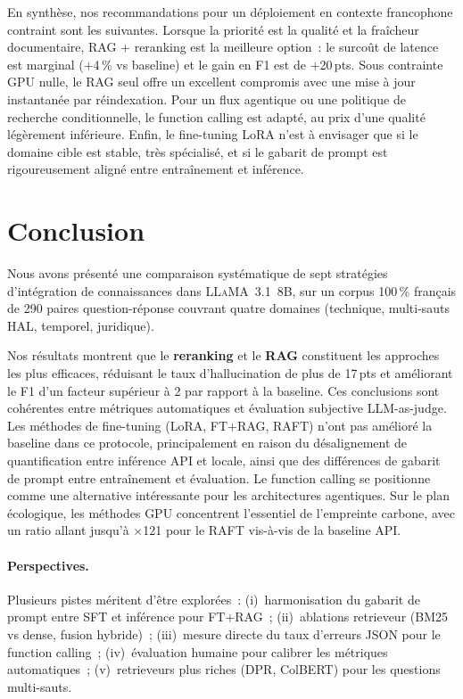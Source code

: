 \documentclass[10pt,journal,compsoc]{IEEEtran}
\begin{document}
En synthèse, nos recommandations pour un déploiement en contexte
francophone contraint sont les suivantes. Lorsque la priorité est la
qualité et la fraîcheur documentaire, RAG + reranking est la meilleure
option~: le surcoût de latence est marginal ($+$4\,\% vs baseline) et
le gain en F1 est de $+$20\,pts. Sous contrainte GPU nulle, le RAG
seul offre un excellent compromis avec une mise à jour instantanée
par réindexation. Pour un flux agentique ou une politique de recherche
conditionnelle, le function calling est adapté, au prix d'une qualité
légèrement inférieure. Enfin, le fine-tuning LoRA n'est à envisager
que si le domaine cible est stable, très spécialisé, et si le gabarit
de prompt est rigoureusement aligné entre entraînement et inférence.


\section{Conclusion}
\label{sec:conclusion}

Nous avons présenté une comparaison systématique de sept stratégies
d'intégration de connaissances dans \textsc{LLaMA}~3.1~8B, sur un
corpus 100\,\% français de 290 paires question-réponse couvrant quatre
domaines (technique, multi-sauts HAL, temporel, juridique).

Nos résultats montrent que le \textbf{reranking} et le \textbf{RAG}
constituent les approches les plus efficaces, réduisant le taux
d'hallucination de plus de 17\,pts et améliorant le F1 d'un facteur
supérieur à 2 par rapport à la baseline. Ces conclusions sont
cohérentes entre métriques automatiques et évaluation subjective
LLM-as-judge. Les méthodes de fine-tuning (LoRA, FT+RAG, RAFT)
n'ont pas amélioré la baseline dans ce protocole, principalement
en raison du désalignement de quantification entre inférence API
et locale, ainsi que des différences de gabarit de prompt entre
entraînement et évaluation.
Le function calling se positionne comme une alternative intéressante
pour les architectures agentiques. Sur le plan écologique, les
méthodes GPU concentrent l'essentiel de l'empreinte carbone, avec
un ratio allant jusqu'à $\times$121 pour le RAFT vis-à-vis de la
baseline API.

\paragraph{Perspectives.}
Plusieurs pistes méritent d'être explorées~: (i)~harmonisation du
gabarit de prompt entre SFT et inférence pour FT+RAG~;
(ii)~ablations retrieveur (BM25 vs dense, fusion hybride)~;
(iii)~mesure directe du taux d'erreurs JSON pour le function
calling~; (iv)~évaluation humaine pour calibrer les métriques
automatiques~; (v)~retrieveurs plus riches (DPR, ColBERT) pour
les questions multi-sauts.
\end{document}
